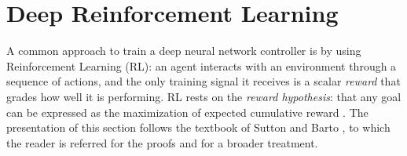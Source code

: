 
\section{Deep Reinforcement Learning}


A common approach to train a deep neural network controller is by using Reinforcement Learning (RL): an agent interacts with an environment through a sequence of actions, and the only training signal it receives is a scalar \emph{reward} that grades how well it is performing. RL rests on the \emph{reward hypothesis}: that any goal can be expressed as the maximization of expected cumulative reward \cite{suttonbarto2018}. The presentation of this section follows the textbook of Sutton and Barto \cite{suttonbarto2018}, to which the reader is referred for the proofs and for a broader treatment.

